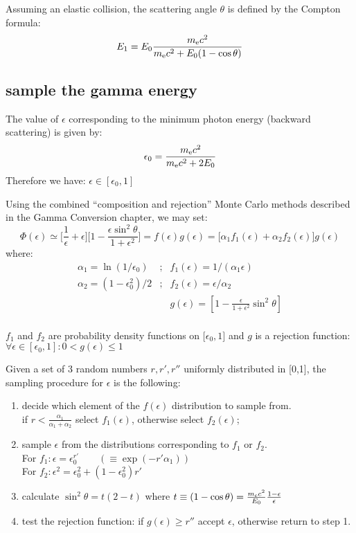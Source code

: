 \noindent 
Assuming an elastic collision, the scattering angle $\theta$ is
defined by the Compton formula: 
\[
   E_1   = E_0 \frac{m_{\rm e}c^2}{ m_{\rm e}c^2 + E_0(1-\cos\theta )}
\]

\subsection{sample the gamma energy}
The value of $\epsilon$ corresponding to the minimum
photon energy (backward scattering) is given by:
\[ \epsilon_0 = \frac{m_{\rm e}c^2}{m_{\rm e}c^2+2E_0} \]
Therefore we have: \qquad $\epsilon \in [\epsilon_0, 1]$
 
\noindent
Using the combined ``composition and rejection'' Monte Carlo methods
described in the Gamma Conversion chapter, we may set:
\[
\Phi(\epsilon)
     \simeq  \lbrack \frac{1}{\epsilon}+\epsilon\rbrack
                \lbrack 1 - \frac{\epsilon \sin^2 \theta}{1+\epsilon^2}\rbrack
     = f(\epsilon) g(\epsilon)
     = \lbrack \alpha_1 f_1(\epsilon) + \alpha_2 f_2(\epsilon)\rbrack 
               g(\epsilon)
\]
where: 
\[
\begin{array}{lcl}
\alpha_1      = \ln (1/\epsilon_0) & ; & 
f_1(\epsilon) = 1/(\alpha_1\epsilon)       \\
\alpha_2      = (1-\epsilon_0^2)/2 & ; &
f_2(\epsilon) = \epsilon/\alpha_2           \\
   & &
g(\epsilon)   = \left[ 1 - \frac{\epsilon}{1+\epsilon^2} \sin^2\theta \right]
\end{array}
\]
\\
$f_1$ and $f_2$ are probability density functions on $\lbrack\epsilon_0, 1\rbrack$ 
and $g$ is a rejection function: 
  $\forall \epsilon \in [\epsilon_0, 1] : 0 < g(\epsilon) \leq 1$
  
\noindent 
Given a set of 3 random numbers $r, r', r''$ uniformly distributed in [0,1],
the sampling procedure for $\epsilon$ is the following:
\begin{enumerate}
\item
decide which element of the $f(\epsilon)$ distribution to sample from. \\
if $ r < \frac{\alpha_1}{\alpha_1+\alpha_2}$ select $f_1(\epsilon)$,
                                   otherwise select $f_2(\epsilon)$; 
\item 
sample $\epsilon$ from the distributions corresponding to $f_1$ or $f_2$. \\ 
For $f_1 : \epsilon   = \epsilon_0^{r'} \qquad (\equiv \exp(-r' \alpha_1))$ \\ 
For $f_2 : \epsilon^2 = \epsilon_0^2 + (1-\epsilon_0^2)r'$
 
\item 
calculate $\sin^2\theta = t(2-t)$ 
where $t \equiv (1-\cos\theta) = \frac{m_{\rm e}c^2}{E_0}
                                 \frac{1-\epsilon}{\epsilon}$ 

\item 
test the rejection function: if $g(\epsilon) \geq r''$ accept
$\epsilon$, otherwise return to step 1.
\end{enumerate}

